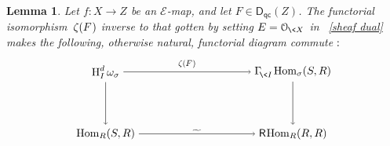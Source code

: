 \documentclass{compositio}
\theoremstyle{plain}
\newtheorem{lem}[thm]{Lemma}
\theoremstyle{definition}
\theoremstyle{remark}
\numberwithin{equation}{thm}
\begin{document}
\medbreak
\begin{lem}
\label{RHom} 
Let\/ $f\colon X\to Z$ be an\/ ${\mathscr{E}}$-map, and let\/ $F\in{{\boldsymbol{\mathsf{D}}}_{\mathsf{qc}}}(Z)$. The  functorial isomorphism~$\zeta(F{\mkern1mu})$ inverse to that gotten by setting\/ $E={\mathcal O_{{\mkern-1mu}\<X}}$ in\/~ \eqref{sheaf dual}
makes the following, otherwise natural, functorial diagram commute${\mkern1mu}:$
\[

 \begin{tikzpicture}[xscale=6, yscale=1.0]

   \node(11) at (1,-1){$\textup{H}^d_I\,\omega_\sigma$};   
   \node(12) at (2,-1){$\Gamma^{}_{\!{\mkern-1mu}\<I}{\mkern-1mu}\operatorname{Hom}_\sigma(S,R)$}; 
  
   \node(31) at (1,-3){$\operatorname{Hom}_R(S,R)$};  
   \node(32) at (2,-3){${\mathsf R}{\mkern-1mu}{\mkern-1mu}\operatorname{Hom}_R(R,R)$};
   
  
    \draw[->] (11)--(12) node[above=1pt, midway, scale=.75] {$\zeta(F{\mkern1mu})$};  
    
    \draw[->] (31)--(32) node[above=1pt, midway, scale=.75] {${\vbox to 0pt{\vss\hbox{$\widetilde{\phantom{nn}}$}\vskip-7pt}}$}; 
    
 
     \draw[->] (11)--(31) ;
 
     \draw[->] (12)--(32) ;    
    
 
    \end{tikzpicture}
\]
\end{lem}
\end{document}
